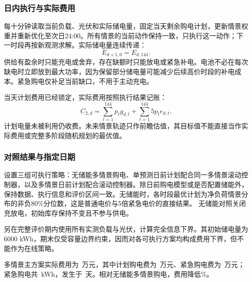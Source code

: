 \subsubsection{日内执行与实际费用}
每十分钟读取当前负载、光伏和实际储电量，固定当天剩余购电计划，更新情景权重并重新优化至次日24:00。所有情景的当前动作保持一致，只执行这一动作；下一时段再按新观测求解。实际储电量连续传递：
\begin{equation}E_{d+1,0}=E_{d,144}.\end{equation}
供给有盈余时只能充电或舍弃，存在缺额时只能放电或紧急补电。电池不必在每次缺电时立即放到最大功率，因为保留部分储电量可能减少后续高价时段的补电成本。紧急购电仅补足当前缺口，不用于主动充电。

当天计划费用已经锁定，实际费用按照执行结果记账：
\begin{equation}
C_{2,d}=\sum_{t=1}^{144}p_tg_{d,t}+\sum_{t=1}^{144}5p_te_{d,t}.
\end{equation}
计划电量未被利用仍收费。未来情景轨迹只作前瞻估值，其目标值不能直接当作实际费用或完整多阶段随机规划的最优值。

\subsubsection{对照结果与指定日期}

设置三组可执行策略：无储能多情景购电、单预测日前计划配合同一多情景滚动控制器，以及多情景日前计划配合滚动控制器。除日前购电模型或是否配置储能外，保持数据、执行信息和评价区间一致。无储能时，各时段最优计划为净负荷情景分布的非负80\%分位数，这是普通电价与5倍紧急电价的直接结果。
无储能对照关闭充放电，初始库存保持不变且不参与供电。

另在完整评价期内使用所有实测负载与光伏，计算完全信息下界。其初始储电量为6000 kWh，期末仅受容量边界约束，因而对各可执行方案均构成费用下界，但不能作为在线策略。

\begin{table}[htbp]\centering\scriptsize
\caption{评价期策略比较}\label{tab:q2compare}
\resizebox{\textwidth}{!}{}
\end{table}
多情景主方案实际费用为\QtwoCost\ 万元，其中计划购电费为\QtwoPlanCost\ 万元、紧急购电费为\QtwoEmergencyCost\ 万元；紧急购电共\QtwoEmergency\ kWh，发生于\QtwoDays\ 天。相对无储能多情景购电，费用降低\QtwoNoStorageSaving\%。


